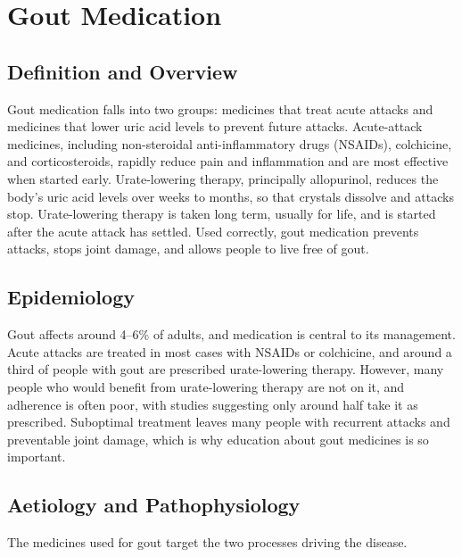 \chapter{Gout Medication}

\section*{Definition and Overview}
Gout medication falls into two groups: medicines that treat acute attacks and medicines that lower uric acid levels to prevent future attacks. Acute-attack medicines, including non-steroidal anti-inflammatory drugs (NSAIDs), colchicine, and corticosteroids, rapidly reduce pain and inflammation and are most effective when started early. Urate-lowering therapy, principally allopurinol, reduces the body's uric acid levels over weeks to months, so that crystals dissolve and attacks stop. Urate-lowering therapy is taken long term, usually for life, and is started after the acute attack has settled. Used correctly, gout medication prevents attacks, stops joint damage, and allows people to live free of gout.

\section*{Epidemiology}
Gout affects around 4--6\% of adults, and medication is central to its management. Acute attacks are treated in most cases with NSAIDs or colchicine, and around a third of people with gout are prescribed urate-lowering therapy. However, many people who would benefit from urate-lowering therapy are not on it, and adherence is often poor, with studies suggesting only around half take it as prescribed. Suboptimal treatment leaves many people with recurrent attacks and preventable joint damage, which is why education about gout medicines is so important.

\section*{Aetiology and Pathophysiology}
The medicines used for gout target the two processes driving the disease.

